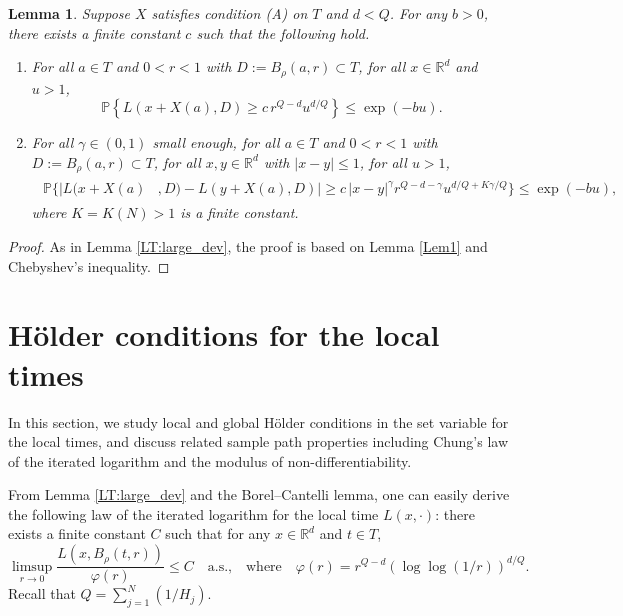 \documentclass[11pt, reqno]{amsart}
\newtheorem{lemma}[theorem]{Lemma}
\def\R{{\mathbb R}}
\def\P{{\mathbb P}}
\numberwithin{equation}{section}
\begin{document}
\begin{lemma}\label{Lem2}
Suppose $X$ satisfies condition \textup{(A)} on $T$ and $d < Q$. %
For any $b > 0$, there exists a finite constant $c$ such that the following hold.
\begin{enumerate}
\item[(i)] For all $a \in T$ and $0 < r < 1$ with $D:=B_\rho(a, r) \subset T$, for all $x \in \R^d$ and $u > 1$,
\begin{equation}\label{Lem2:Eq1}
\P\left\{ L(x + X(a), D) \ge c\, r^{Q-d} u^{d/Q} \right\} \le \exp(-bu).
\end{equation}
\item[(ii)] For all $\gamma \in (0, 1)$ small enough, for all $a \in T$ and $0 < r < 1$ with $D:=B_\rho(a, r) \subset T$, 
for all $x, y \in \R^d$ with $|x-y|\le 1$, for all $u > 1$,
\begin{align}
\begin{aligned}\label{Lem2:Eq2}
\P\Big\{|L(x + X(a)&, D) - L(y + X(a), D)|
\ge c\, |x-y|^{\gamma} r^{Q-d-\gamma}u^{d/Q + K\gamma/Q}\Big\} \le \exp(-bu),
\end{aligned}
\end{align}
where $K = K(N) > 1$ is a finite constant.
\end{enumerate}
\end{lemma}

\begin{proof}
As in Lemma \ref{LT:large_dev}, the proof is based on Lemma \ref{Lem1} and Chebyshev's inequality.
\end{proof}

\section{H\"{o}lder conditions for the local times}
\label{sect:Holder_cond}

In this section, we study local and global H\"older conditions in the set variable for the local times, and discuss related 
sample path properties including Chung's law of the iterated logarithm and the modulus of non-differentiability.

From Lemma \ref{LT:large_dev} and the Borel--Cantelli lemma, one can easily derive the following law of the iterated 
logarithm for the local time $L(x, \cdot)$: there exists a finite constant $C$ such that for any $x \in \R^d$ and $t \in T$, 
\begin{equation}\label{LIL:LT}
\limsup_{r \to 0} \frac{L(x, B_\rho(t, r))}{\varphi(r)} \le C \quad \text{a.s.,} \quad \text{where} \quad \varphi(r) = 
r^{Q-d}(\log\log(1/r))^{d/Q}.
\end{equation}
Recall that $Q = \sum_{j=1}^N (1/H_j)$.
\end{document}
